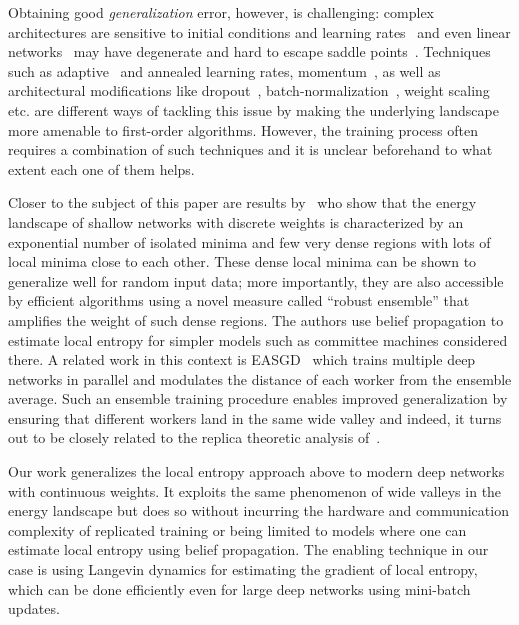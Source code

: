 \documentclass[10pt]{article}
\begin{document}
Obtaining good \emph{generalization} error, however, is challenging: complex architectures are sensitive to initial conditions and learning rates~\citep{sutskever2013importance} and even linear networks~\citep{kawaguchi2016deep} may have degenerate and hard to escape saddle points~\citep{ge2015escaping,anandkumar2016efficient}. Techniques such as adaptive~\citep{duchi2011adaptive} and annealed learning rates, momentum~\citep{tieleman2012lecture}, as well as architectural modifications like dropout~\citep{srivastava2014dropout}, batch-normalization~\citep{ioffe2015batch,cooijmans2016recurrent}, weight scaling~\citep{salimans2016weight} etc. are different ways of tackling this issue by making the underlying landscape more amenable to first-order algorithms. However, the training process often requires a combination of such techniques and it is unclear beforehand to what extent each one of them helps.

Closer to the subject of this paper are results by~\citet{baldassi2015subdominant,baldassi2016unreasonable,baldassi2016multilevel} who show that the energy landscape of shallow networks with discrete weights is characterized by an exponential number of isolated minima and few very dense regions with lots of local minima close to each other. These dense local minima can be shown to generalize well for random input data; more importantly, they are also accessible by efficient algorithms using a novel measure called ``robust ensemble'' that amplifies the weight of such dense regions. The authors use belief propagation to estimate local entropy for simpler models such as committee machines considered there. A related work in this context is EASGD~\citep{zhang2015deep} which trains multiple deep networks in parallel and modulates the distance of each worker from the ensemble average. Such an ensemble training procedure enables improved generalization by ensuring that different workers land in the same wide valley and indeed, it turns out to be closely related to the replica theoretic analysis of~\citet{baldassi2016unreasonable}.

Our work generalizes the local entropy approach above to modern deep networks with continuous weights. It exploits the same phenomenon of wide valleys in the energy landscape but does so without incurring the hardware and communication complexity of replicated training or being limited to models where one can estimate local entropy using belief propagation. The enabling technique in our case is using Langevin dynamics for estimating the gradient of local entropy, which can be done efficiently even for large deep networks using mini-batch updates.
\end{document}
